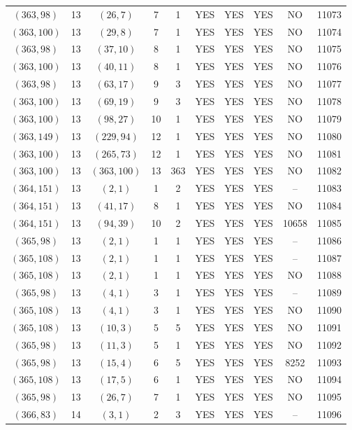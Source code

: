 \begin{longtable}{|c|c|c|c|c|c|c|c|c|c|}
$(363, 98)$ & 13 & $(26, 7)$ & 7 & 1 & YES & YES & YES & NO & 11073\\
$(363, 100)$ & 13 & $(29, 8)$ & 7 & 1 & YES & YES & YES & NO & 11074\\
$(363, 98)$ & 13 & $(37, 10)$ & 8 & 1 & YES & YES & YES & NO & 11075\\
$(363, 100)$ & 13 & $(40, 11)$ & 8 & 1 & YES & YES & YES & NO & 11076\\
$(363, 98)$ & 13 & $(63, 17)$ & 9 & 3 & YES & YES & YES & NO & 11077\\
$(363, 100)$ & 13 & $(69, 19)$ & 9 & 3 & YES & YES & YES & NO & 11078\\
$(363, 100)$ & 13 & $(98, 27)$ & 10 & 1 & YES & YES & YES & NO & 11079\\
$(363, 149)$ & 13 & $(229, 94)$ & 12 & 1 & YES & YES & YES & NO & 11080\\
$(363, 100)$ & 13 & $(265, 73)$ & 12 & 1 & YES & YES & YES & NO & 11081\\
$(363, 100)$ & 13 & $(363, 100)$ & 13 & 363 & YES & YES & YES & NO & 11082\\
$(364, 151)$ & 13 & $(2, 1)$ & 1 & 2 & YES & YES & YES & -- & 11083\\
$(364, 151)$ & 13 & $(41, 17)$ & 8 & 1 & YES & YES & YES & NO & 11084\\
$(364, 151)$ & 13 & $(94, 39)$ & 10 & 2 & YES & YES & YES & 10658 & 11085\\
$(365, 98)$ & 13 & $(2, 1)$ & 1 & 1 & YES & YES & YES & -- & 11086\\
$(365, 108)$ & 13 & $(2, 1)$ & 1 & 1 & YES & YES & YES & -- & 11087\\
$(365, 108)$ & 13 & $(2, 1)$ & 1 & 1 & YES & YES & YES & NO & 11088\\
$(365, 98)$ & 13 & $(4, 1)$ & 3 & 1 & YES & YES & YES & -- & 11089\\
$(365, 108)$ & 13 & $(4, 1)$ & 3 & 1 & YES & YES & YES & NO & 11090\\
$(365, 108)$ & 13 & $(10, 3)$ & 5 & 5 & YES & YES & YES & NO & 11091\\
$(365, 98)$ & 13 & $(11, 3)$ & 5 & 1 & YES & YES & YES & NO & 11092\\
$(365, 98)$ & 13 & $(15, 4)$ & 6 & 5 & YES & YES & YES & 8252 & 11093\\
$(365, 108)$ & 13 & $(17, 5)$ & 6 & 1 & YES & YES & YES & NO & 11094\\
$(365, 98)$ & 13 & $(26, 7)$ & 7 & 1 & YES & YES & YES & NO & 11095\\
$(366, 83)$ & 14 & $(3, 1)$ & 2 & 3 & YES & YES & YES & -- & 11096\\

\end{longtable}

